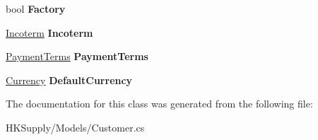 \begin{DoxyCompactItemize}
\mbox{\label{class_h_k_supply_1_1_models_1_1_customer_a7dea4de3875931a6eba5a7951f463664}} 
bool {\bfseries Factory}
\item 
\mbox{\label{class_h_k_supply_1_1_models_1_1_customer_a5134c8822af9dc72bd4c69fab93e8744}} 
\mbox{\hyperlink{class_h_k_supply_1_1_models_1_1_incoterm}{Incoterm}} {\bfseries Incoterm}
\item 
\mbox{\label{class_h_k_supply_1_1_models_1_1_customer_aee7eefbcd153834de38f27753c022818}} 
\mbox{\hyperlink{class_h_k_supply_1_1_models_1_1_payment_terms}{Payment\+Terms}} {\bfseries Payment\+Terms}
\item 
\mbox{\label{class_h_k_supply_1_1_models_1_1_customer_a388c5980f48b2f173d34b89fedacdbd9}} 
\mbox{\hyperlink{class_h_k_supply_1_1_models_1_1_currency}{Currency}} {\bfseries Default\+Currency}
\end{DoxyCompactItemize}


The documentation for this class was generated from the following file\+:\begin{DoxyCompactItemize}
\item 
H\+K\+Supply/\+Models/Customer.\+cs\end{DoxyCompactItemize}
